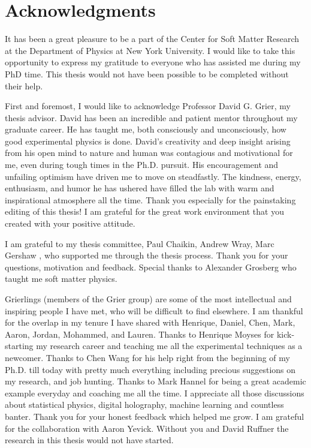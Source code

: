 \chapter*{Acknowledgments}
\label{ch:acknowledgments}


It has been a great pleasure to be a part of the Center for Soft Matter Research at the Department of Physics at New York University. I would like to take this opportunity to express my gratitude to everyone who has assisted me during my PhD time. This thesis would not have been possible to be completed without their help.

First and foremost, I would like to acknowledge Professor David G. Grier, my thesis advisor. David has been an incredible and patient mentor throughout my graduate career. He has taught me, both consciously and unconsciously, how good experimental physics is done. David's creativity and deep insight arising from his open mind to nature and human  was contagious and motivational for me, even during tough times in the Ph.D. pursuit. His encouragement and unfailing optimism have driven me to move on steadfastly. The kindness, energy, enthusiasm, and humor he has ushered have filled the lab with warm and inspirational atmosphere all the time.  Thank you especially for the painstaking editing of this thesis! I am grateful for the great work environment that you created with your positive attitude.

I am grateful to my thesis committee, Paul Chaikin, Andrew Wray, Marc Gershaw , who supported me through the thesis process. Thank you for your questions, motivation and feedback. Special thanks to Alexander Grosberg who taught me soft matter physics.

Grierlings (members of the Grier group) are some of the most intellectual and inspiring people I have met, who will be difficult to find elsewhere. I am thankful for the overlap in my tenure I have shared with Henrique, Daniel, Chen, Mark, Aaron, Jordan, Mohammed, and Lauren. Thanks to Henrique Moyses for kick-starting my research career and teaching me all the experimental techniques as a newcomer. Thanks to Chen Wang for his help right from the beginning of my Ph.D. till today with pretty much everything including precious suggestions on my research, and job hunting. Thanks to Mark Hannel for being a great academic example everyday and coaching me all the time. I appreciate all those discussions about statistical physics, digital holography, machine learning and countless banter. Thank you for your honest feedback which helped me grow. I am grateful for the collaboration with Aaron Yevick. Without you and David Ruffner the research in this thesis would not have started.

